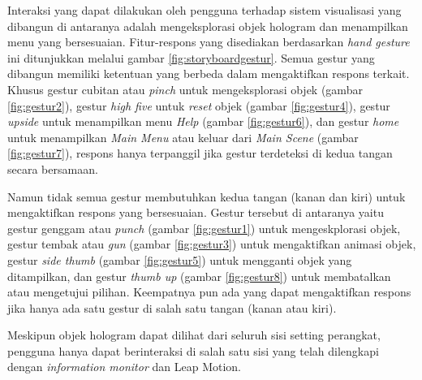 		Interaksi yang dapat dilakukan oleh pengguna terhadap sistem visualisasi yang dibangun di antaranya adalah mengeksplorasi objek hologram dan menampilkan menu yang bersesuaian. Fitur-respons yang disediakan berdasarkan \textit{hand gesture} ini ditunjukkan melalui gambar \ref{fig:storyboardgestur}. Semua gestur yang dibangun memiliki ketentuan yang berbeda dalam mengaktifkan respons terkait. Khusus gestur cubitan atau \textit{pinch} untuk mengeksplorasi objek (gambar \ref{fig:gestur2}), gestur \textit{high five} untuk \textit{reset} objek (gambar \ref{fig:gestur4}), gestur \textit{upside} untuk menampilkan menu \textit{Help} (gambar \ref{fig:gestur6}), dan gestur \textit{home} untuk menampilkan \textit{Main Menu} atau keluar dari \textit{Main Scene} (gambar \ref{fig:gestur7}), respons hanya terpanggil jika gestur terdeteksi di kedua tangan secara bersamaan. 
		
		Namun tidak semua gestur membutuhkan kedua tangan (kanan dan kiri) untuk mengaktifkan respons yang bersesuaian. Gestur tersebut di antaranya yaitu gestur genggam atau \textit{punch} (gambar \ref{fig:gestur1}) untuk mengeskplorasi objek, gestur tembak atau \textit{gun} (gambar \ref{fig:gestur3}) untuk mengaktifkan animasi objek, gestur \textit{side thumb} (gambar \ref{fig:gestur5}) untuk mengganti objek yang ditampilkan, dan gestur \textit{thumb up} (gambar \ref{fig:gestur8}) untuk membatalkan atau mengetujui pilihan. Keempatnya pun ada yang dapat mengaktifkan respons jika hanya ada satu gestur di salah satu tangan (kanan atau kiri). 
		
		Meskipun objek hologram dapat dilihat dari seluruh sisi setting perangkat, pengguna hanya dapat berinteraksi di salah satu sisi yang telah dilengkapi dengan \textit{information monitor} dan Leap Motion.
		

		
